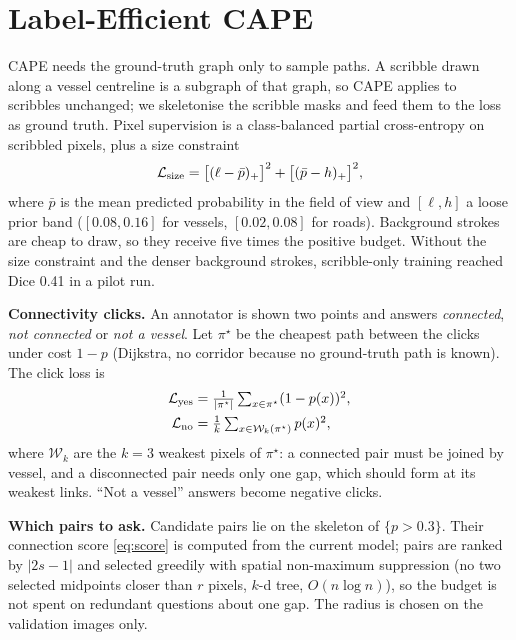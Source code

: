 \documentclass[10pt,letterpaper,journal]{IEEEtran}
\newcommand{\1}{\mathbf{1}}
\begin{document}
\section{Label-Efficient CAPE}\label{sec:label}
CAPE needs the ground-truth graph only to sample paths. A scribble drawn along a vessel centreline is a subgraph of that graph, so CAPE applies to scribbles unchanged; we skeletonise the scribble masks and feed them to the loss as ground truth. Pixel supervision is a class-balanced partial cross-entropy on scribbled pixels, plus a size constraint \cite{kervadec2019}
\[\mathcal L_{\rm size}=\big[(\ell-\bar p)_+\big]^2+\big[(\bar p-h)_+\big]^2,\]
where $\bar p$ is the mean predicted probability in the field of view and $[\ell,h]$ a loose prior band ($[0.08,0.16]$ for vessels, $[0.02,0.08]$ for roads). Background strokes are cheap to draw, so they receive five times the positive budget. Without the size constraint and the denser background strokes, scribble-only training reached Dice 0.41 in a pilot run.

\textbf{Connectivity clicks.} An annotator is shown two points and answers \emph{connected}, \emph{not connected} or \emph{not a vessel}. Let $\pi^\star$ be the cheapest path between the clicks under cost $1-p$ (Dijkstra, no corridor because no ground-truth path is known). The click loss is
\begin{align*}
\mathcal L_{\rm yes}&=\tfrac1{|\pi^\star|}\textstyle\sum_{x\in\pi^\star}(1-p(x))^2,\\
\mathcal L_{\rm no}&=\tfrac1k\textstyle\sum_{x\in\mathcal W_k(\pi^\star)}p(x)^2,
\end{align*}
where $\mathcal W_k$ are the $k=3$ weakest pixels of $\pi^\star$: a connected pair must be joined by vessel, and a disconnected pair needs only one gap, which should form at its weakest links. ``Not a vessel'' answers become negative clicks.

\textbf{Which pairs to ask.} Candidate pairs lie on the skeleton of $\{p>0.3\}$. Their connection score \eqref{eq:score} is computed from the current model; pairs are ranked by $|2s-1|$ and selected greedily with spatial non-maximum suppression (no two selected midpoints closer than $r$ pixels, $k$-d tree, $O(n\log n)$), so the budget is not spent on redundant questions about one gap. The radius is chosen on the validation images only.
\end{document}
